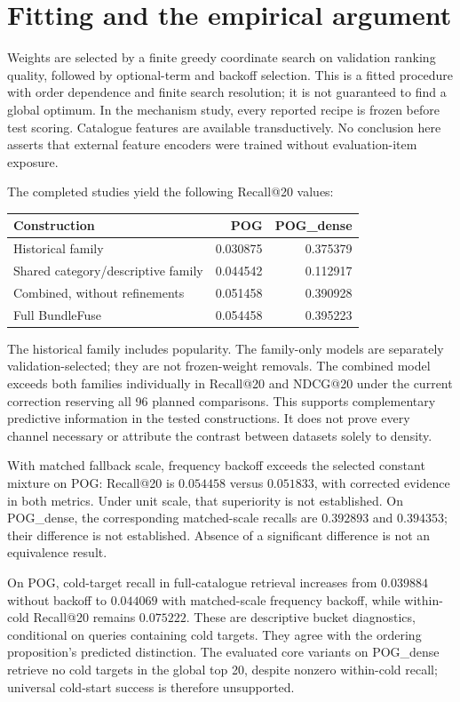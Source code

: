 \documentclass[11pt,a4paper]{article}
\begin{document}
\section{Fitting and the empirical argument}\label{evidence}
Weights are selected by a finite greedy coordinate search on validation ranking
quality, followed by optional-term and backoff selection. This is a fitted procedure
with order dependence and finite search resolution; it is not guaranteed to find
a global optimum. In the mechanism study, every reported recipe is frozen before
test scoring. Catalogue features are available transductively. No conclusion here
asserts that external feature encoders were trained without evaluation-item exposure.

The completed studies yield the following Recall@20 values:
\begin{center}
\begin{tabular}{@{}lrr@{}}\toprule
Construction & POG & POG\_dense \\\midrule
Historical family & 0.030875 & 0.375379\\
Shared category/descriptive family & 0.044542 & 0.112917\\
Combined, without refinements & 0.051458 & 0.390928\\
Full BundleFuse & 0.054458 & 0.395223\\\bottomrule
\end{tabular}
\end{center}
The historical family includes popularity. The family-only models are separately
validation-selected; they are not frozen-weight removals. The combined model exceeds
both families individually in Recall@20 and NDCG@20 under the current correction
reserving all 96 planned comparisons. This supports complementary predictive
information in the tested constructions. It does not prove every channel necessary
or attribute the contrast between datasets solely to density.

With matched fallback scale, frequency backoff exceeds the selected constant mixture
on POG: Recall@20 is $0.054458$ versus $0.051833$, with corrected evidence in both
metrics. Under unit scale, that superiority is not established. On POG\_dense,
the corresponding matched-scale recalls are $0.392893$ and $0.394353$; their difference
is not established. Absence of a significant difference is not an equivalence result.

On POG, cold-target recall in full-catalogue retrieval increases from $0.039884$
without backoff to $0.044069$ with matched-scale frequency backoff, while within-cold
Recall@20 remains $0.075222$. These are descriptive bucket diagnostics, conditional
on queries containing cold targets. They agree with the ordering proposition's
predicted distinction. The evaluated core variants on POG\_dense retrieve no cold
targets in the global top 20, despite nonzero within-cold recall; universal cold-start
success is therefore unsupported.
\end{document}

